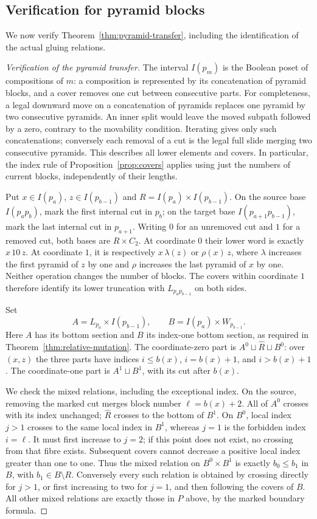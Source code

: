 \documentclass[11pt]{article}
\theoremstyle{definition}
\begin{document}
\subsection{Verification for pyramid blocks}
\label{app:pyramid-application}
We now verify Theorem~\ref{thm:pyramid-transfer}, including the
identification of the actual gluing relations.
\begin{proof}[Verification of the pyramid transfer]
The interval $I(p_m)$ is the Boolean poset of compositions of $m$:
a composition is represented by its concatenation of pyramid
blocks, and a cover removes one cut between consecutive parts.
For completeness, a legal downward move on a concatenation of
pyramids replaces one pyramid by two consecutive pyramids. An
inner split would leave the moved subpath followed by a zero,
contrary to the movability condition. Iterating gives only such concatenations;
conversely each removal of a cut is the legal full slide merging
two consecutive pyramids. This describes all lower elements and
covers. In particular, the index rule of
Proposition~\ref{prop:covers} applies using just the numbers of
current blocks, independently of their lengths.

Put $x\in I(p_a)$, $z\in I(p_{b-1})$ and
$R=I(p_a)\times I(p_{b-1})$. On the source base $I(p_a p_b)$,
mark the first internal cut in $p_b$; on the target base
$I(p_{a+1}p_{b-1})$, mark the last internal cut in $p_{a+1}$.
Writing $0$ for an unremoved cut and $1$ for a removed cut,
both bases are $R\times C_2$. At coordinate $0$ their lower word
is exactly $x\,10\,z$. At coordinate $1$, it is respectively
$x\,\lambda(z)$ or $\rho(x)\,z$, where $\lambda$ increases the
first pyramid of $z$ by one and $\rho$ increases the last pyramid
of $x$ by one. Neither operation changes the number of blocks.
The covers within coordinate $1$ therefore identify its lower
truncation with $L_{p_a p_{b-1}}$ on both sides.

Set
\[
 A=L_{p_a}\times I(p_{b-1}),\qquad
 B=I(p_a)\times W_{p_{b-1}}.
\]
Here $A$ has its bottom section and $B$ its index-one bottom
section, as required in Theorem~\ref{thm:relative-mutation}.
The coordinate-zero part is $A^0\sqcup\widehat R\sqcup B^0$:
over $(x,z)$ the three parts have indices
$i\leq b(x)$, $i=b(x)+1$, and $i>b(x)+1$. The coordinate-one
part is $A^1\sqcup B^1$, with its cut after $b(x)$.

We check the mixed relations, including the exceptional index.
On the source, removing the marked cut merges block number
$\ell=b(x)+2$. All of $A^0$ crosses with its index unchanged;
$\widehat R$ crosses to the bottom of $B^1$. On $B^0$, local
index $j>1$ crosses to the same local index in $B^1$, whereas
$j=1$ is the forbidden index $i=\ell$. It must first increase
to $j=2$; if this point does not exist, no crossing from that
fibre exists. Subsequent covers cannot decrease a positive
local index greater than one to one. Thus the mixed relation on
$B^0\times B^1$ is exactly $b_0\leq b_1$ in $B$, with
$b_1\in B\setminus R$. Conversely every such relation is
obtained by crossing directly for $j>1$, or first increasing to
two for $j=1$, and then following the covers of $B$. All other
mixed relations are exactly those in $P$ above, by the marked
boundary formula.


\end{proof}
\end{document}
